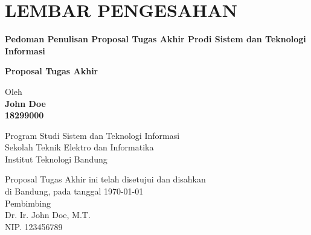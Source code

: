 \chapter*{LEMBAR PENGESAHAN}


\begin{center}
    \vspace{2cm}
  {\large\bfseries Pedoman Penulisan Proposal Tugas Akhir Prodi Sistem dan Teknologi Informasi}\\
     \vspace{2cm}

  {\Large \textbf{Proposal Tugas Akhir}}\\


  \vspace{1.5cm}
    
    
  {\large Oleh}\\[0.3cm]
    \textbf{
    {\large John Doe}\\
    {\large 18299000}
  }\\
    
  \vspace{0.5cm}
 
  {\large Program Studi Sistem dan Teknologi Informasi}\\
  {\large Sekolah Teknik Elektro dan Informatika}\\
  {\large Institut Teknologi Bandung}\\

  \vspace{1.5cm}

  Proposal Tugas Akhir ini telah disetujui dan disahkan\\ 
  di Bandung, pada tanggal \today\\[1cm]

	Pembimbing  \\[3cm]
	Dr. Ir. John Doe, M.T.   \\[0.2cm]
	NIP. 123456789 

\end{center}

\vspace{1cm}
\noindent



